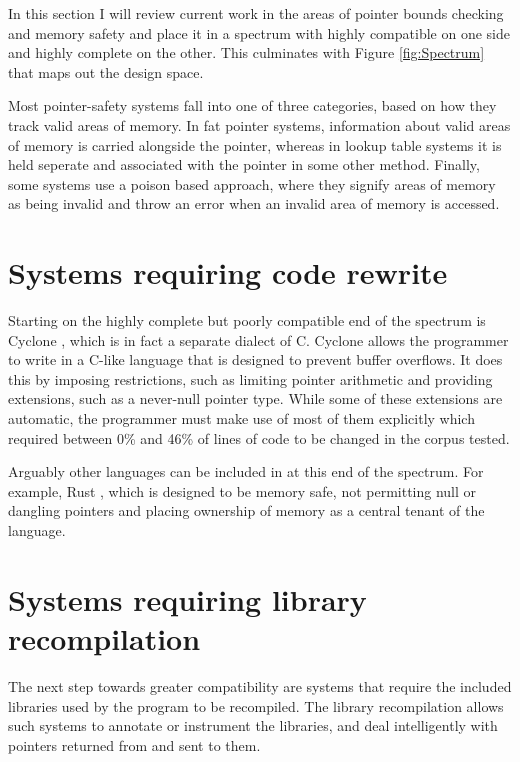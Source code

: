 

In this section I will review current work in the areas of pointer bounds checking and memory safety and place it in a spectrum with highly compatible on one side and highly complete on the other.
This culminates with Figure \ref{fig:Spectrum} that maps out the design space.

Most pointer-safety systems fall into one of three categories, based on how they track valid areas of memory.
In fat pointer systems, information about valid areas of memory is carried alongside the pointer, whereas in lookup table systems it is held seperate and associated with the pointer in some other method.
Finally, some systems use a poison based approach, where they signify areas of memory as being invalid and throw an error when an invalid area of memory is accessed.

\section{Systems requiring code rewrite}
Starting on the highly complete but poorly compatible end of the spectrum is Cyclone \cite{jim2002cyclone}, which is in fact a separate dialect of C.
Cyclone allows the programmer to write in a C-like language that is designed to prevent buffer overflows.
It does this by imposing restrictions, such as limiting pointer arithmetic and providing extensions, such as a never-null pointer type.
While some of these extensions are automatic, the programmer must make use of most of them explicitly which required between 0\% and 46\% of lines of code to be changed in the corpus tested.

Arguably other languages can be included in at this end of the spectrum. 
For example, Rust \cite{rust}, which is designed to be memory safe, not permitting null or dangling pointers and placing ownership of memory as a central tenant of the language.

\section{Systems requiring library recompilation}

The next step towards greater compatibility are systems that require the included libraries used by the program to be recompiled.
The library recompilation allows such systems to annotate or instrument the libraries, and deal intelligently with pointers returned from and sent to them.

